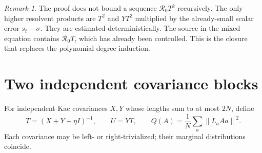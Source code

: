 \documentclass[11pt]{article}
\theoremstyle{definition}\newtheorem{definition}[theorem]{Definition}
\theoremstyle{remark}\newtheorem{remark}[theorem]{Remark}
\newcommand{\R}{\mathcal R}
\newcommand{\norm}[1]{\left\lVert#1\right\rVert}
\begin{document}
\begin{remark}
The proof does not bound a sequence $\R_0T^k$ recursively. The only higher resolvent products are $T^2$ and $YT^2$ multiplied by the already-small scalar error $s_t-\sigma$. They are estimated deterministically. The source in the mixed equation contains $\R_0T$, which has already been controlled. This is the closure that replaces the polynomial degree induction.
\end{remark}

\section{Two independent covariance blocks}\label{sec:two-block}
For independent Kac covariances $X,Y$ whose lengths sum to at most $2N$, define
\[
 T=(X+Y+\eta I)^{-1},\qquad U=YT,\qquad
 Q(A)=\frac1N\sum_a\norm{L_aAa}^2.
\]
Each covariance may be left- or right-trivialized; their marginal distributions coincide.
\end{document}
